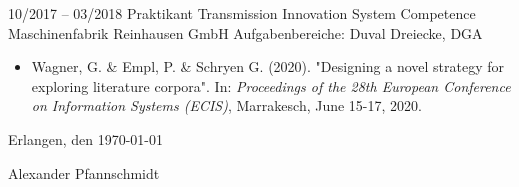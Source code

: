 \cvevent
{10/2017 -- 03/2018}
{Praktikant}
{Transmission Innovation System Competence \newline Maschinenfabrik Reinhausen GmbH}
{Aufgabenbereiche: Duval Dreiecke, DGA}
\vfill\null


\begin{itemize}[leftmargin=*]
	\item Wagner, G. \& Empl, P. \&  Schryen G. (2020). "Designing a novel strategy for exploring literature corpora". In: \textit{Proceedings of the 28th European Conference on Information Systems (ECIS)}, Marrakesch, June 15-17, 2020.
\end{itemize}
\mbox{}
\vfill
\mbox{}
\vfill
\mbox{}
\vfill
\mbox{}
\vfill
\mbox{}


Erlangen, den \today     \hspace{1cm}   \hrulefill

\hspace*{30mm}\phantom{Erlangen, den \today }Alexander Pfannschmidt
